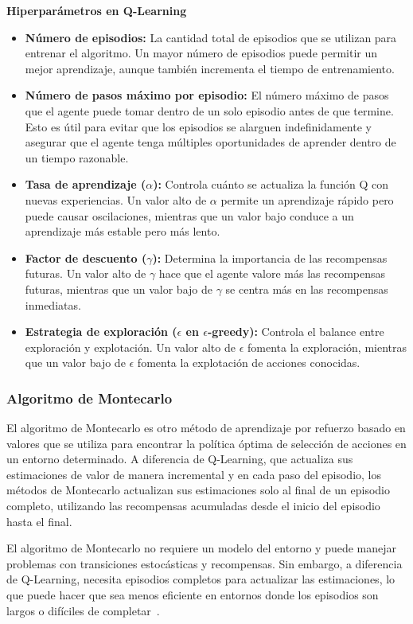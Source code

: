 \documentclass[conference,a4paper]{IEEEtran}
\begin{document}
\textbf{Hiperparámetros en Q-Learning}
\begin{itemize}
  \item \textbf{Número de episodios:} La cantidad total de episodios que se utilizan para entrenar el algoritmo. Un mayor número de episodios puede permitir un mejor aprendizaje, aunque también incrementa el tiempo de entrenamiento.
  \item \textbf{Número de pasos máximo por episodio:} El número máximo de pasos que el agente puede tomar dentro de un solo episodio antes de que termine. Esto es útil para evitar que los episodios se alarguen indefinidamente y asegurar que el agente tenga múltiples oportunidades de aprender dentro de un tiempo razonable.
  \item \textbf{Tasa de aprendizaje (\(\alpha\)):} Controla cuánto se actualiza la función Q con nuevas experiencias. Un valor alto de \(\alpha\) permite un aprendizaje rápido pero puede causar oscilaciones, mientras que un valor bajo conduce a un aprendizaje más estable pero más lento.
  \item \textbf{Factor de descuento (\(\gamma\)):} Determina la importancia de las recompensas futuras. Un valor alto de \(\gamma\) hace que el agente valore más las recompensas futuras, mientras que un valor bajo de \(\gamma\) se centra más en las recompensas inmediatas.
  \item \textbf{Estrategia de exploración (\(\epsilon\) en \(\epsilon\)-greedy):} Controla el balance entre exploración y explotación. Un valor alto de \(\epsilon\) fomenta la exploración, mientras que un valor bajo de \(\epsilon\) fomenta la explotación de acciones conocidas.\newline
\end{itemize}


\subsubsection{\textbf{Algoritmo de Montecarlo}}
El algoritmo de Montecarlo es otro método de aprendizaje por refuerzo basado en valores que se utiliza para encontrar la política óptima de selección de acciones en un entorno determinado. A diferencia de Q-Learning, que actualiza sus estimaciones de valor de manera incremental y en cada paso del episodio, los métodos de Montecarlo actualizan sus estimaciones solo al final de un episodio completo, utilizando las recompensas acumuladas desde el inicio del episodio hasta el final.

El algoritmo de Montecarlo no requiere un modelo del entorno y puede manejar problemas con transiciones estocásticas y recompensas. Sin embargo, a diferencia de Q-Learning, necesita episodios completos para actualizar las estimaciones, lo que puede hacer que sea menos eficiente en entornos donde los episodios son largos o difíciles de completar~\cite{b5}.
\end{document}
